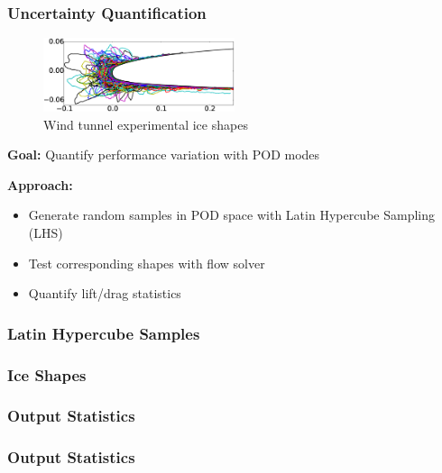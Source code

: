 \documentclass[9pt]{beamer}
\begin{document}
\begin{frame}
\frametitle{Uncertainty Quantification}
\label{sec-2-8}

\vspace*{-0.0cm}\begin{figure}
      \includegraphics[width=0.5\textwidth]{GlobalDataSet}
      \caption{Wind tunnel experimental ice shapes}
\end{figure}
\textbf{Goal:} Quantify performance variation with POD modes

\textbf{Approach:}
\begin{itemize}
\item Generate random samples in POD space with Latin Hypercube Sampling (LHS)
\item Test corresponding shapes with flow solver
\item Quantify lift/drag statistics
\end{itemize}
\end{frame}
\begin{frame}
\frametitle{Latin Hypercube Samples}
\label{sec-2-9}
\end{frame}
\begin{frame}
\frametitle{Ice Shapes}
\label{sec-2-10}
\end{frame}
\begin{frame}
\frametitle{Output Statistics}
\label{sec-2-11}
\end{frame}
\begin{frame}
\frametitle{Output Statistics}
\label{sec-2-12}
\end{frame}
\end{document}
